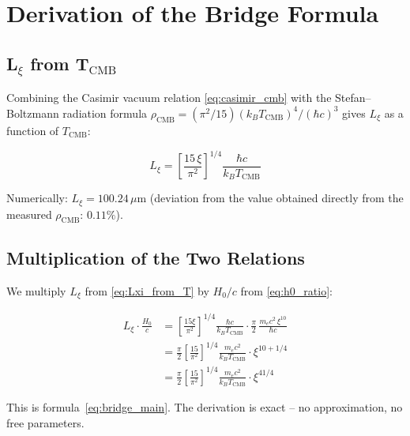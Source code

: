 \section{Derivation of the Bridge Formula}
\label{sec:derivation}

\subsection{L\texorpdfstring{$_\xi$}{xi} from T\texorpdfstring{$_\text{CMB}$}{CMB}}

Combining the Casimir vacuum relation \eqref{eq:casimir_cmb} with the
Stefan--Boltzmann radiation formula
$\rho_\text{CMB} = (\pi^2/15)(k_B T_\text{CMB})^4/(\hbar c)^3$
gives $L_\xi$ as a function of $T_\text{CMB}$:

\begin{equation}
    L_\xi = \left[\frac{15\,\xi}{\pi^2}\right]^{1/4}
    \frac{\hbar c}{k_B T_\text{CMB}}
    \label{eq:Lxi_from_T}
\end{equation}

Numerically: $L_\xi = 100.24\,\mu\text{m}$
(deviation from the value obtained directly from the measured $\rho_\text{CMB}$: $0.11\%$).

\subsection{Multiplication of the Two Relations}

We multiply $L_\xi$ from \eqref{eq:Lxi_from_T} by $H_0/c$ from
\eqref{eq:h0_ratio}:

\begin{align}
    L_\xi \cdot \frac{H_0}{c}
    &= \left[\frac{15\xi}{\pi^2}\right]^{1/4}
       \frac{\hbar c}{k_B T_\text{CMB}}
       \cdot \frac{\pi}{2}\,\frac{m_e c^2\,\xi^{10}}{\hbar c}
    \nonumber\\[6pt]
    &= \frac{\pi}{2}\left[\frac{15}{\pi^2}\right]^{1/4}
       \frac{m_e c^2}{k_B T_\text{CMB}}
       \cdot \xi^{10 + 1/4}
    \nonumber\\[6pt]
    &= \frac{\pi}{2}\left[\frac{15}{\pi^2}\right]^{1/4}
       \frac{m_e c^2}{k_B T_\text{CMB}}
       \cdot \xi^{41/4}
    \label{eq:bridge_derivation}
\end{align}

This is formula~\eqref{eq:bridge_main}. The derivation is exact -- no approximation,
no free parameters.

